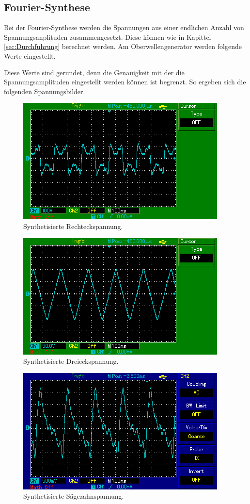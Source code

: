 \subsection{Fourier-Synthese}
Bei der Fourier-Synthese werden die Spannungen aus einer endlichen Anzahl von
Spannungsanplituden zusammengesetzt. Diese können wie in Kapittel \ref{sec:Durchführung}
berechnet werden.
Am Oberwellengenerator werden folgende Werte eingestellt.

Diese Werte sind gerundet, denn die Genauigkeit mit der die Spannungsamplituden
eingestellt werden können ist begrenzt.
So ergeben sich die folgenden Spannungsbilder. \\
\begin{figure}[H]
  \centering
  \includegraphics{recht.png}
  \caption{Synthetisierte Rechteckspannung.}
  \label{fig:Rechteck}
\end{figure}

\begin{figure}[H]
  \centering
  \includegraphics{drei.png}
  \caption{Synthetisierte Dreieckspannung.}
  \label{fig:Dreieck}
\end{figure}

\begin{figure}
  \centering
  \includegraphics{sag.png}
  \caption{Synthetisierte Sägezahnspannung.}
  \label{fig:Säge}
\end{figure}

